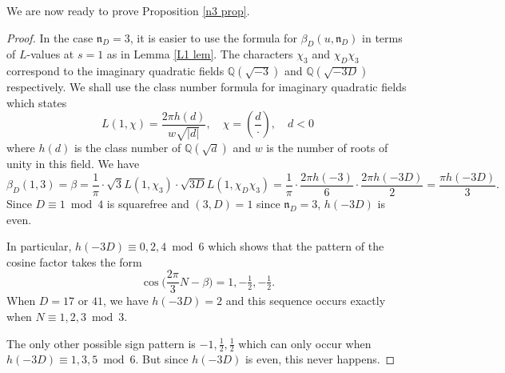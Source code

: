 \documentclass[11pt]{amsart}
\numberwithin{equation}{section}
\newcommand{\mb}{\mathbb}
\newcommand{\mf}{\mathfrak}
\newcommand{\n}{\mf{n}_D}
\theoremstyle{remark}
\begin{document}
\par
We are now ready to prove Proposition \ref{n3 prop}.
\begin{proof} In the case $\n=3$, it is easier to use the formula for $\beta_D(u,\mf{n}_D)$ in terms of $L$-values at $s=1$ as in Lemma \ref{L1 lem}. The characters $\chi_3$ and $\chi_D \chi_3$ correspond to the imaginary quadratic fields $\mathbb{Q}(\sqrt{-3})$ and $\mathbb{Q}(\sqrt{-3D})$ respectively. We shall use the class number formula for imaginary quadratic fields which states
\begin{equation*}
L(1,\chi)=\frac{2\pi h(d)}{w \sqrt{\lvert d \rvert}}, \quad \chi = \left( \frac{d}{\cdot}\right), \quad d<0
\end{equation*} 
where $h(d)$ is the class number of $\mb{Q}(\sqrt{d})$ and $w$ is the number of roots of unity in this field. We have
\[
\beta_D(1,3)
= \beta =
\frac{1}{\pi}\cdot\sqrt{3}L(1,\chi_3)\cdot\sqrt{3D}L(1,\chi_D\chi_3)
=
\frac{1}{\pi}\cdot \frac{2\pi h(-3)}{6}\cdot \frac{2\pi h(-3D)}{2}
=
\frac{\pi h(-3D)}{3}.
\]
Since $D \equiv 1 \bmod 4$ is squarefree and $(3,D)=1$ since $\n=3$, $h(-3 D)$ is even. 

In particular, $h(-3D)\equiv 0,2,4 \bmod 6$ which shows that the pattern of the cosine factor takes the form 
\[
 \cos\bigg(\frac{2\pi}{3}N-\beta\bigg)=1,-\tfrac12,-\tfrac12.
\]
When $D=17$ or $41$, we have $h(-3D)=2$ and this sequence occurs exactly when $N \equiv 1,2,3\bmod 3$. 

The only other possible sign pattern is $-1,\frac12,\frac12$ which can only occur when $h(-3D)\equiv 1,3,5 \bmod 6$. But since $h(-3D)$ is even, this never happens. 



\end{proof}
\end{document}
